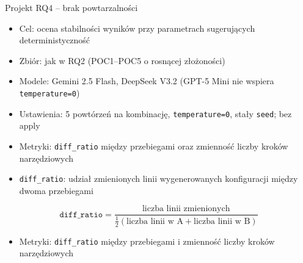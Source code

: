 \documentclass[aspectratio=169]{beamer}
\begin{document}
\begin{frame}{Projekt RQ4 -- brak powtarzalności}
    \begin{itemize}
        \item Cel: ocena stabilności wyników przy parametrach sugerujących deterministyczność
        \item Zbiór: jak w RQ2 (POC1--POC5 o rosnącej złożoności)
        \item Modele: Gemini 2.5 Flash, DeepSeek V3.2 (GPT-5 Mini nie wspiera \texttt{temperature=0})
        \item Ustawienia: 5 powtórzeń na kombinację, \texttt{temperature=0}, stały \texttt{seed}; bez apply
        \item Metryki: \texttt{diff\_ratio} między przebiegami oraz zmienność liczby kroków narzędziowych
        \item \texttt{diff\_ratio}: udział zmienionych linii wygenerowanych konfiguracji między dwoma przebiegami
    \end{itemize}
    \[
        \texttt{diff\_ratio} = \frac{\text{liczba linii zmienionych}}{\tfrac{1}{2}(\text{liczba linii w A} + \text{liczba linii w B})}
    \]
    \begin{itemize}
        \item Metryki: \texttt{diff\_ratio} między przebiegami i zmienność liczby kroków narzędziowych
    \end{itemize}
\end{frame}
\end{document}
